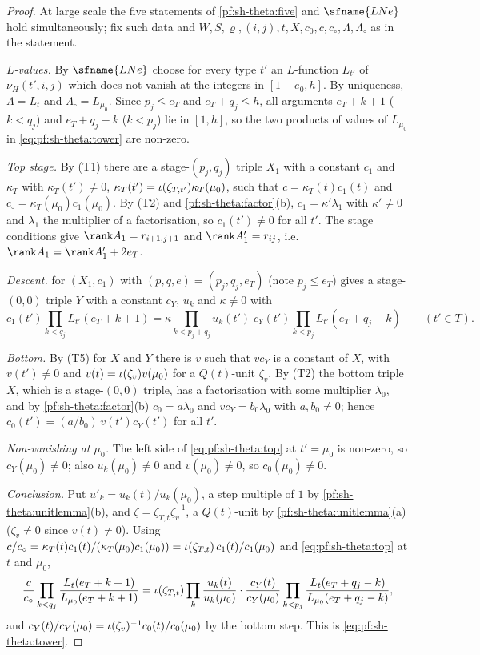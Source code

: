 \begin{proof}
At large scale the five statements of \cref{pf:sh-theta:five} and $\sfname{LNe}$ hold simultaneously; fix such data and
$W,S,\varrho,(i,j),t,X,c_0,c,c_\circ,\Lambda,\Lambda_\circ$ as in the statement.

\emph{$L$-values.} By $\sfname{LNe}$ choose for every type $t'$ an $L$-function $L_{t'}$ of $\nu_H(t',i,j)$ which does not vanish
at the integers in $[1-e_0,h]$. By uniqueness, $\Lambda=L_t$ and $\Lambda_\circ=L_{\mu_0}$. Since $p_j\le e_T$ and
$e_T+q_j\le h$, all arguments $e_T+k+1$ ($k<q_j$) and $e_T+q_j-k$ ($k<p_j$) lie in $[1,h]$, so the two products of values of
$L_{\mu_0}$ in \eqref{eq:pf:sh-theta:tower} are non-zero.

\emph{Top stage.} By (T1) there are a stage-$(p_j,q_j)$ triple $X_1$ with a constant $c_1$ and $\kappa_T$ with
$\kappa_T(t')\ne0$, $\kappa_T(t')=\iota(\zeta_{T,t'})\kappa_T(\mu_0)$, such that $c=\kappa_T(t)c_1(t)$ and
$c_\circ=\kappa_T(\mu_0)c_1(\mu_0)$. By (T2) and \cref{pf:sh-theta:factor}(b), $c_1=\kappa'\lambda_1$ with $\kappa'\ne0$ and
$\lambda_1$ the multiplier of a factorisation, so $c_1(t')\ne0$ for all $t'$. The stage conditions give $\rank A_1=r_{i+1,j+1}$
and $\rank A_1'=r_{ij}$, i.e.\ $\rank A_1=\rank A'_1+2e_T$.

\emph{Descent.}  for $(X_1,c_1)$ with $(p,q,e)=(p_j,q_j,e_T)$ (note $p_j\le e_T$) gives a
stage-$(0,0)$ triple $Y$ with a constant $c_Y$, $u_k$ and $\kappa\ne0$ with
\begin{equation}\label{eq:pf:sh-theta:top}
c_1(t')\prod_{k<q_j}L_{t'}(e_T+k+1)=\kappa\prod_{k<p_j+q_j}u_k(t')\;c_Y(t')\prod_{k<p_j}L_{t'}(e_T+q_j-k)\qquad(t'\in T).
\end{equation}

\emph{Bottom.} By (T5) for $X$ and $Y$ there is $v$ such that $vc_Y$ is a constant of $X$, with $v(t')\ne0$ and
$v(t)=\iota(\zeta_v)v(\mu_0)$ for a $Q(t)$-unit $\zeta_v$. By (T2) the bottom triple $X$, which is a stage-$(0,0)$ triple,
has a factorisation with some multiplier $\lambda_0$, and by \cref{pf:sh-theta:factor}(b) $c_0=a\lambda_0$ and
$vc_Y=b_0\lambda_0$ with $a,b_0\ne0$; hence $c_0(t')=(a/b_0)\,v(t')c_Y(t')$ for all $t'$.

\emph{Non-vanishing at $\mu_0$.} The left side of \eqref{eq:pf:sh-theta:top} at $t'=\mu_0$ is non-zero, so $c_Y(\mu_0)\ne0$;
also $u_k(\mu_0)\ne0$ and $v(\mu_0)\ne0$, so $c_0(\mu_0)\ne0$.

\emph{Conclusion.} Put $u'_k=u_k(t)/u_k(\mu_0)$, a step multiple of $1$ by \cref{pf:sh-theta:unitlemma}(b), and
$\zeta=\zeta_{T,t}\zeta_v^{-1}$, a $Q(t)$-unit by \cref{pf:sh-theta:unitlemma}(a) ($\zeta_v\ne0$ since $v(t)\ne0$). Using
$c/c_\circ=\kappa_T(t)c_1(t)/(\kappa_T(\mu_0)c_1(\mu_0))=\iota(\zeta_{T,t})\,c_1(t)/c_1(\mu_0)$ and
\eqref{eq:pf:sh-theta:top} at $t$ and $\mu_0$,
\[
\frac c{c_\circ}\prod_{k<q_j}\frac{L_t(e_T+k+1)}{L_{\mu_0}(e_T+k+1)}
=\iota(\zeta_{T,t})\prod_k\frac{u_k(t)}{u_k(\mu_0)}\cdot\frac{c_Y(t)}{c_Y(\mu_0)}
\prod_{k<p_j}\frac{L_t(e_T+q_j-k)}{L_{\mu_0}(e_T+q_j-k)},
\]
and $c_Y(t)/c_Y(\mu_0)=\iota(\zeta_v)^{-1}c_0(t)/c_0(\mu_0)$ by the bottom step. This is \eqref{eq:pf:sh-theta:tower}.
\end{proof}

